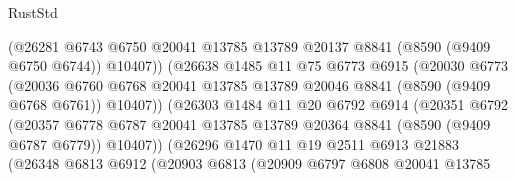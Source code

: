 \begin{lexlean}{RustStd}
\begin{coremodule}
                              (@26281
                                @6743
                                @6750
                                @20041
                                @13785
                                @13789
                                @20137
                                @8841
                                (@8590 (@9409 @6750 @6744))
                                @10407))
                            (@26638
                              @1485
                              @11
                              @75
                              @6773
                              @6915
                              (@20030
                                @6773
                                (@20036
                                  @6760
                                  @6768
                                  @20041
                                  @13785
                                  @13789
                                  @20046
                                  @8841
                                  (@8590 (@9409 @6768 @6761))
                                  @10407))
                              (@26303
                                @1484
                                @11
                                @20
                                @6792
                                @6914
                                (@20351
                                  @6792
                                  (@20357
                                    @6778
                                    @6787
                                    @20041
                                    @13785
                                    @13789
                                    @20364
                                    @8841
                                    (@8590 (@9409 @6787 @6779))
                                    @10407))
                                (@26296
                                  @1470
                                  @11
                                  @19
                                  @2511
                                  @6913
                                  @21883
                                  (@26348
                                    @6813
                                    @6912
                                    (@20903
                                      @6813
                                      (@20909
                                        @6797
                                        @6808
                                        @20041
                                        @13785

\end{coremodule}
\end{lexlean}

